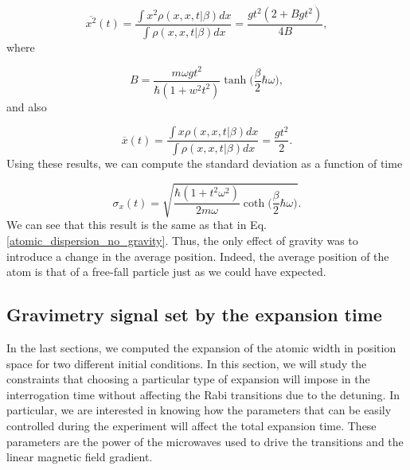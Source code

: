 \documentclass{article}
\begin{document}
\begin{equation}
    \overline{x^{2}} (t)= \frac{\int x^{2} \rho(x,x,t|\beta) dx}{\int \rho(x,x,t|\beta) dx} =  \frac{g t^{2} (2+B g t^{2})}{4B},
\end{equation}
%
where 

\begin{equation}
    B = \frac{m \omega g t^{2}}{\hbar (1+w^{2}t^{2})} \tanh \bigg(\frac{\beta}{2} \hbar \omega\bigg),
\end{equation}
%
and also

\begin{equation}\label{average_position_dipole_trap}
    \overline{x} (t)= \frac{\int x \rho(x,x,t|\beta) dx}{\int \rho(x,x,t|\beta) dx} =  \frac{g t^{2}}{2}.
\end{equation}
%
Using these results, we can compute the standard deviation as a function of time

\begin{equation}\label{atomic_dispersion_with_gravity}
    \sigma_{x} (t) = \sqrt{\frac{\hbar (1+t^{2} \omega^{2})}{2 m \omega} \coth \bigg(\frac{\beta}{2} \hbar \omega \bigg)}.
\end{equation}
%
We can see that this result is the same as that in Eq. \ref{atomic_dispersion_no_gravity}. Thus, the only effect of gravity was to introduce a change in the average position. Indeed, the average position of the atom is that of a free-fall particle just as we could have expected.

\subsection{Gravimetry signal set by the expansion time}
In the last sections, we computed the expansion of the atomic width in position space for two different initial conditions. In this section, we will study the constraints that choosing a particular type of expansion will impose in the interrogation time without affecting the Rabi transitions due to the detuning. In particular, we are interested in knowing how the parameters that can be easily controlled during the experiment will affect the total expansion time. These parameters are the power of the microwaves used to drive the transitions and the linear magnetic field gradient.
\end{document}
